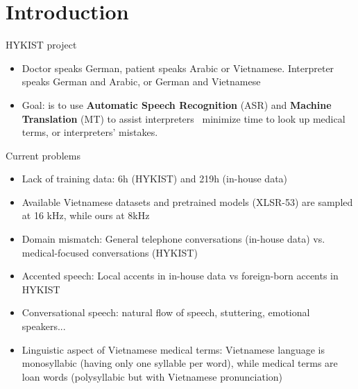 \section{Introduction}

\begin{frame}{HYKIST project}
\begin{itemize}
    \item Doctor speaks German, patient speaks Arabic or Vietnamese. 
    Interpreter speaks German and Arabic, or German and  Vietnamese
    \item  Goal: is to use \textbf{Automatic Speech Recognition} (ASR) and \textbf{Machine Translation} (MT) to assist interpreters \textrightarrow \, minimize time to look up medical terms, or interpreters' mistakes.

\end{itemize}
\end{frame}

\begin{frame}{Current problems}

\begin{itemize}
    \item Lack of training data: 6h (HYKIST) and 219h  (in-house data) 
    \item Available Vietnamese datasets and pretrained models (XLSR-53) are sampled at 16 kHz, while ours at 8kHz
    \item Domain mismatch: General telephone conversations (in-house data) vs. medical-focused conversations (HYKIST)
    \item Accented speech: Local accents in in-house data vs foreign-born accents in HYKIST
    \item Conversational speech: natural flow of speech, stuttering, emotional speakers...
    \item Linguistic aspect of Vietnamese medical terms: Vietnamese language is monosyllabic (having only one syllable per word), while medical terms are loan words (polysyllabic but with Vietnamese pronunciation) 
\end{itemize}

\end{frame}

